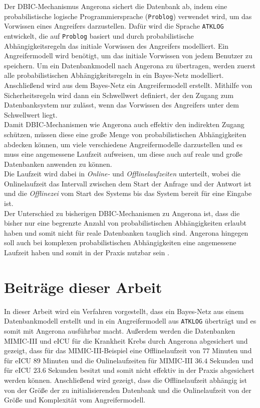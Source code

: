 \documentclass[german,version-2020-11]{uzl-thesis}
\begin{document}
Der DBIC-Mechanismus Angerona sichert die Datenbank ab, indem eine probabilistische logische Programmiersprache (\texttt{Problog}) verwendet wird, um das Vorwissen eines Angreifers darzustellen. Dafür wird die Sprache \texttt{ATKLOG} entwickelt, die auf \texttt{Problog} basiert und durch probabilistische Abhängigkeitsregeln das initiale Vorwissen des Angreifers modelliert. Ein Angreifermodell wird benötigt, um das initiale Vorwissen von jedem Benutzer zu speichern.  Um ein Datenbankmodell nach Angerona zu übertragen, werden zuerst alle probabilistischen Abhängigkeitsregeln in ein Bayes-Netz modelliert. Anschließend wird aus dem Bayes-Netz ein Angreifermodell erstellt. Mithilfe von Sicherheitsregeln wird dann ein Schwellwert definiert, der den Zugang zum Datenbanksystem nur zulässt, wenn das Vorwissen des Angreifers unter dem Schwellwert liegt. \\  
Damit DBIC-Mechanismen wie Angerona auch effektiv den indirekten Zugang schützen, müssen diese eine große Menge von probabilistischen Abhängigkeiten abdecken können, um viele verschiedene Angreifermodelle darzustellen und es muss eine angemessene Laufzeit aufweisen, um diese auch auf reale und große Datenbanken anwenden zu können.\\
Die Laufzeit wird dabei in \emph{Online-} und \emph{Offlinelaufzeiten} unterteilt, wobei die Onlinelaufzeit  das Intervall zwischen dem Start der Anfrage und der Antwort ist und die \emph{Offlinezei}  vom Start des Systems bis das System bereit für eine Eingabe ist. \\
Der Unterschied zu bisherigen DBIC-Mechanismen zu Angerona ist, dass die bisher nur eine begrenzte Anzahl von probabilistischen Abhängigkeiten erlaubt haben und somit nicht für reale Datenbanken tauglich sind. Angerona hingegen soll auch bei komplexen probabilistischen Abhängigkeiten eine angemessene Laufzeit haben und somit in der Praxis nutzbar sein \cite{guarnieri2017securing}. \\

\section{Beiträge dieser Arbeit}
In dieser Arbeit wird ein Verfahren vorgestellt, dass ein Bayes-Netz aus einem Datenbankmodell erstellt und in ein Angreifermodell aus \texttt{ATKLOG} überträgt und es somit mit Angerona ausführbar macht. Außerdem werden die Datenbanken MIMIC-III und eICU für die Krankheit Krebs durch Angerona abgesichert und gezeigt, dass für das MIMIC-III-Beispiel eine Offlinelaufzeit von $77$ Minuten und für eICU $89$ Minuten und die Onlinelaufzeiten für MIMIC-III $36.4$ Sekunden und für eICU $23.6$ Sekunden besitzt und somit nicht effektiv in der Praxis abgesichert werden können. Anschließend wird gezeigt, dass die Offlinelaufzeit abhängig ist von der Größe der zu initialisierenden Datenbank und die Onlinelaufzeit von der Größe und Komplexität vom Angreifermodell.
\end{document}
